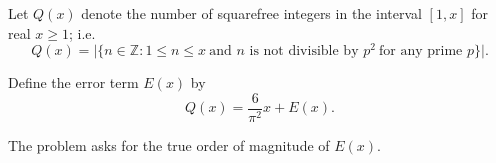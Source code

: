 Let $Q(x)$ denote the number of squarefree integers in the interval $[1,x]$ for real $x\ge 1$; i.e.
\[
Q(x)=\bigl|\{n\in\mathbb Z: 1\le n\le x\ \text{and } n \text{ is not divisible by } p^2\ \text{for any prime }p\}\bigr|.
\]

Define the error term $E(x)$ by
\[
Q(x)=\frac{6}{\pi^2}x + E(x).
\]

The problem asks for the true order of magnitude of $E(x)$.
